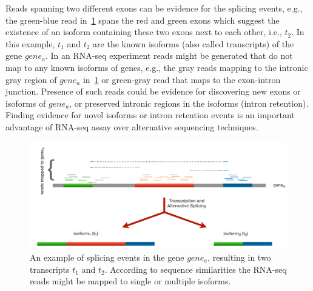Reads spanning two different exons can be evidence for the splicing events, 
e.g., the green-blue read in~\cref{fig:altsplice} spans the red and green 
exons which suggest the existence of an isoform containing these two exons 
next to each other, i.e., $t_2$. In this example, $t_1$ and $t_2$ are the 
known isoforms (also called transcripts) of the gene $gene_a$. In an RNA-seq 
experiment reads might be generated that do not map to any known isoforms of 
genes, e.g., the gray reads mapping to the intronic gray region of $gene_a$ 
in~\cref{fig:altsplice} or green-gray read that maps to the exon-intron 
junction. Presence of such reads could be evidence for discovering new exons 
or isoforms of $gene_a$, or preserved intronic regions in the isoforms (intron 
retention). Finding evidence for novel isoforms or intron retention events is 
an important advantage of RNA-seq assay over alternative sequencing techniques.

\begin{figure}
 \centering
 \includegraphics[width=0.95\columnwidth]{Figures/intro/alt-splice.pdf}
 \caption[Alternative splicing of genes]{An example of splicing events in 
 the gene $gene_a$, resulting in two transcripts $t_1$ and $t_2$. According 
 to sequence similarities the RNA-seq reads might be mapped to single or 
 multiple isoforms.}
  \label{fig:altsplice}
\end{figure}

